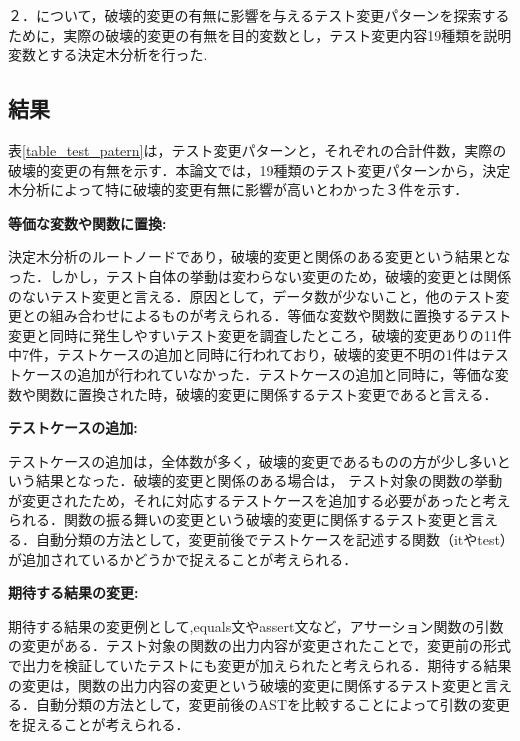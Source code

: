 \documentclass[uplatex,dvipdfmx,a4paper,twocolumn,base=11pt,jbase=11pt,ja=standard]{bxjsarticle}  %
\begin{document}
２．について，破壊的変更の有無に影響を与えるテスト変更パターンを探索するために，実際の破壊的変更の有無を目的変数とし，テスト変更内容19種類を説明変数とする決定木分析を行った.

\subsection{結果}

表\ref{table_test_patern}は，テスト変更パターンと，それぞれの合計件数，実際の破壊的変更の有無を示す．本論文では，19種類のテスト変更パターンから，決定木分析によって特に破壊的変更有無に影響が高いとわかった３件を示す．

\noindent\textbf{等価な変数や関数に置換: }

決定木分析のルートノードであり，破壊的変更と関係のある変更という結果となった．しかし，テスト自体の挙動は変わらない変更のため，破壊的変更とは関係のないテスト変更と言える．原因として，データ数が少ないこと，他のテスト変更との組み合わせによるものが考えられる．等価な変数や関数に置換するテスト変更と同時に発生しやすいテスト変更を調査したところ，破壊的変更ありの11件中7件，テストケースの追加と同時に行われており，破壊的変更不明の1件はテストケースの追加が行われていなかった．テストケースの追加と同時に，等価な変数や関数に置換された時，破壊的変更に関係するテスト変更であると言える．

\noindent\textbf{テストケースの追加: }

テストケースの追加は，全体数が多く，破壊的変更であるものの方が少し多いという結果となった．破壊的変更と関係のある場合は，
テスト対象の関数の挙動が変更されたため，それに対応するテストケースを追加する必要があったと考えられる．関数の振る舞いの変更という破壊的変更に関係するテスト変更と言える．自動分類の方法として，変更前後でテストケースを記述する関数（itやtest）が追加されているかどうかで捉えることが考えられる．



\noindent\textbf{期待する結果の変更: }

期待する結果の変更例として,equals文やassert文など，アサーション関数の引数の変更がある．テスト対象の関数の出力内容が変更されたことで，変更前の形式で出力を検証していたテストにも変更が加えられたと考えられる．期待する結果の変更は，関数の出力内容の変更という破壊的変更に関係するテスト変更と言える．自動分類の方法として，変更前後のASTを比較することによって引数の変更を捉えることが考えられる．
\end{document}
